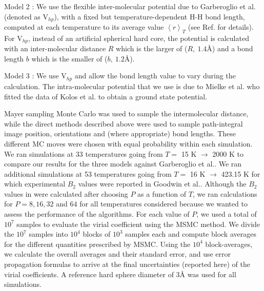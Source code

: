         Model 2 : We use the flexible inter-molecular potential due to Garberoglio et al.\cite{Garberoglio2012} (denoted as V$_{hp}$), with a fixed but temperature-dependent H-H bond length, computed at each temperature to its average value $\left< r \right>_T$ (see Ref. \cite{Garberoglio2012} for details). For V$_{hp}$, instead of an artificial spherical hard core, the potential is calculated with an inter-molecular distance $R$ which is the larger of ($R,\: 1.4${\AA}) and a bond length $b$ which is the smaller of ($b,\: 1.2${\AA}).

        Model 3 : We use V$_{hp}$ and allow the bond length value to vary during the calculation. The intra-molecular potential that we use is due to Mielke et al.\cite{Mielke2002} who fitted the data of Kolos et al.\cite{Kolos1986} to obtain a ground state potential.

        Mayer sampling Monte Carlo was used to sample the intermolecular distance, while the direct methods described above were used to sample path-integral image position, orientations and (where appropriate) bond lengths. These different MC moves were chosen with equal probability within each simulation. We ran simulations at 33 temperatures going from $T =$ 15 K $\to$ 2000 K to compare our results for the three models against Garberoglio et al.\cite{Garberoglio2014}. We ran additional simulations at 53 temperatures going from $T =$ 16 K $\to$ 423.15 K for which experimental $B_2$ values were reported in Goodwin et al.\cite{Goodwin1963}. Although the $B_2$ values in \cite{Garberoglio2014} were calculated after choosing $P$ as a function of $T$, we ran calculations for $P = 8, 16, 32$ and $64$ for all temperatures considered because we wanted to assess the performance of the algorithms. For each value of $P$, we used a total of $10^7$ samples to evaluate the virial coefficient using the MSMC\cite{Singh2004} method. We divide the $10^7$ samples into $10^4$ blocks of $10^3$ samples each and compute block averages for the different quantities prescribed by MSMC. Using the $10^4$ block-averages, we calculate the overall averages and their standard error, and use error propagation formulas to arrive at the final uncertainties (reported here) of the virial coefficients. A reference hard sphere diameter of 3{\AA} was used for all simulations.

